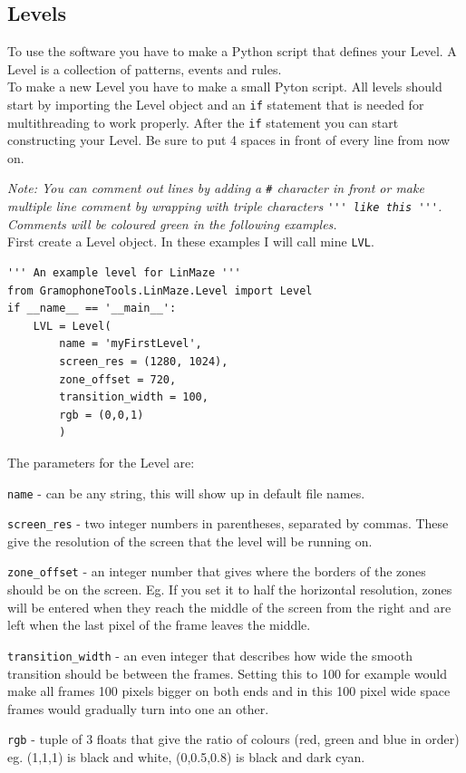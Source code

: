 \documentclass[11pt,a4paper]{article}
\newcommand{\param}[1]{\item \texttt{#1} -}
\newcommand{\note}[1]{\textit{Note: {#1}}}
\begin{document}
\subsection{Levels}
To use the software you have to make a Python script that defines your Level. A Level is a collection of patterns, events and rules.
\\
To make a new Level you have to make a small Pyton script. All levels should start by importing the Level object and an \lstinline{if} statement that is needed for multithreading to work properly. After the \lstinline{if} statement you can start constructing your Level. Be sure to put 4 spaces in front of every line from now on.

\note{You can comment out lines by adding a \texttt{\#} character in front or make multiple line comment by wrapping with triple \texttt{\textquotesingle} characters \lstinline{''' like this '''}. Comments will be coloured green in the following examples.}
\\

First create a Level object. In these examples I will call mine \texttt{LVL}.

\begin{lstlisting}
''' An example level for LinMaze '''
from GramophoneTools.LinMaze.Level import Level
if __name__ == '__main__':
	LVL = Level(
		name = 'myFirstLevel',
		screen_res = (1280, 1024),
		zone_offset = 720,
		transition_width = 100,
		rgb = (0,0,1)
		)
\end{lstlisting}

The parameters for the Level are:
\begin{paramlist}  
\param{name} can be any string, this will show up in default file names.
\param{screen\_res} two integer numbers in parentheses, separated by commas. These give the resolution of the screen that the level will be running on.
\param{zone\_offset} an integer number that gives where the borders of the zones should be on the screen. Eg. If you set it to half the horizontal resolution, zones will be entered when they reach the middle of the screen from the right and are left when the last pixel of the frame leaves the middle.
\param{transition\_width} an even integer that describes how wide the smooth transition should be between the frames. Setting this to 100 for example would make all frames 100 pixels bigger on both ends and in this 100 pixel wide space frames would gradually turn into one an other.
\param{rgb} tuple of 3 floats that give the ratio of colours (red, green and blue in order) eg. (1,1,1) is black and white, (0,0.5,0.8) is black and dark cyan.
\end{paramlist}
\end{document}
